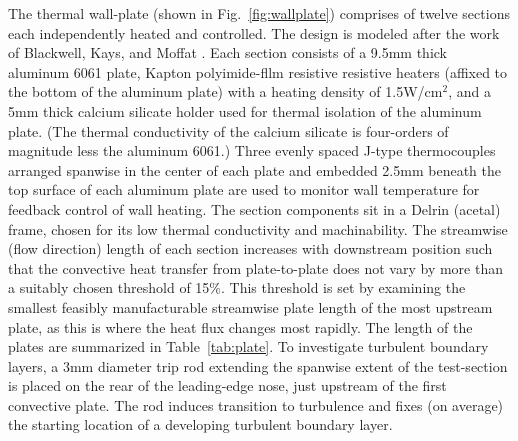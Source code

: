 The thermal wall-plate (shown in Fig.~\ref{fig:wallplate}) comprises of twelve sections each independently heated and controlled. The design is modeled after the work of Blackwell, Kays, and Moffat \cite{Blackwell_1972}. Each section consists of a 9.5mm thick aluminum 6061 plate, Kapton polyimide-fllm resistive resistive heaters (affixed to the bottom of the aluminum plate) with a heating density of 1.5W/cm$^2$, and a 5mm thick calcium silicate holder used for thermal isolation of the aluminum plate. (The thermal conductivity of the calcium silicate is four-orders of magnitude less the aluminum 6061.) Three evenly spaced J-type thermocouples arranged spanwise in the center of each plate and embedded 2.5mm beneath the top surface of each aluminum plate are used to monitor wall temperature for feedback control of wall heating. The section components sit in a Delrin (acetal) frame, chosen for its low thermal conductivity and machinability. The streamwise (flow direction) length of each section increases with downstream position such that the convective heat transfer from plate-to-plate does not vary by more than a suitably chosen threshold of 15\%. This threshold is set by examining the smallest feasibly manufacturable streamwise plate length of the most upstream plate, as this is where the heat flux changes most rapidly. The length of the plates are summarized in Table~\ref{tab:plate}. To investigate turbulent boundary layers, a 3mm diameter trip rod extending the spanwise extent of the test-section is placed on the rear of the leading-edge nose, just upstream of the first convective plate. The rod induces transition to turbulence and fixes (on average) the starting location of a developing turbulent boundary layer.

\begin{table}[h] 
\centering
\caption{\indent The length of the convective plates. Plate 1 is at the upstream end and plate 12 is at the downstream end of the wind tunnel.}
\label{tab:plate}
\end{table}

